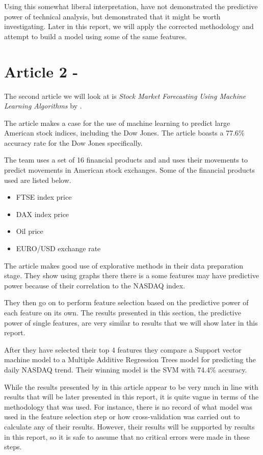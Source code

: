 \documentclass{report}
\begin{document}
Using this somewhat liberal interpretation, \citet{kara2011predicting} have not demonstrated the predictive power of technical analysis, but demonstrated that it might be worth investigating. Later in this report, we will apply the corrected methodology and attempt to build a model using some of the same features.

\section{Article 2 - \citet{shen2012stock}}

The second article we will look at is \textit{Stock Market Forecasting Using Machine Learning Algorithms} by \citet{shen2012stock}.

The article makes a case for the use of machine learning to predict large American stock indices, including the Dow Jones. The article boasts a 77.6\% accuracy rate for the Dow Jones specifically. 

The team uses a set of 16 financial products and and uses their movements to predict movements in American stock exchanges. Some of the financial products used are listed below.

\begin{itemize}[noitemsep]
  \item FTSE index price
  \item DAX index price
  \item Oil price
  \item EURO/USD exchange rate
\end{itemize}

The article makes good use of explorative methods in their data preparation stage. They show using graphs there there is a some features may have predictive power because of their correlation to the NASDAQ index. 

They then go on to perform feature selection based on the predictive power of each feature on its own. The results presented in this section, the predictive power of single features, are very similar to results that we will show later in this report. 

After they have selected their top 4 features they compare a Support vector machine model to a Multiple Additive Regression Trees model for predicting the daily NASDAQ trend. Their winning model is the SVM with 74.4\% accuracy. 

While the results presented by \citet{shen2012stock} in this article appear to be very much in line with results that will be later presented in this report, it is quite vague in terms of the methodology that was used. For instance, there is no record of what model was used in the feature selection step or how cross-validation was carried out to calculate any of their results. However, their results will be supported by results in this report, so it is safe to assume that no critical errors were made in these steps.
\end{document}
